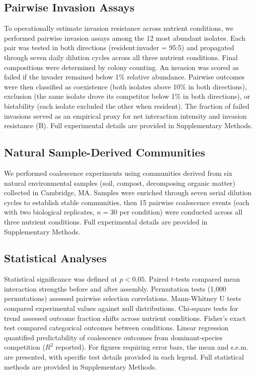 \subsection*{Pairwise Invasion Assays}
\label{sec:methods:invasion}

To operationally estimate invasion resistance across nutrient conditions, we performed pairwise invasion assays among the 12 most abundant isolates. Each pair was tested in both directions (resident:invader = 95:5) and propagated through seven daily dilution cycles across all three nutrient conditions. Final compositions were determined by colony counting. An invasion was scored as failed if the invader remained below 1\% relative abundance. Pairwise outcomes were then classified as coexistence (both isolates above 10\% in both directions), exclusion (the same isolate drove its competitor below 1\% in both directions), or bistability (each isolate excluded the other when resident). The fraction of failed invasions served as an empirical proxy for net interaction intensity and invasion resistance (B). Full experimental details are provided in Supplementary Methods.



\subsection*{Natural Sample-Derived Communities}
\label{sec:methods:natural}

We performed coalescence experiments using communities derived from six natural environmental samples (soil, compost, decomposing organic matter) collected in Cambridge, MA.  Samples were enriched through seven serial dilution cycles to establish stable communities, then 15 pairwise coalescence events (each with two biological replicates, $n = 30$ per condition) were conducted across all three nutrient conditions. Full experimental details are provided in Supplementary Methods.


\subsection*{Statistical Analyses}
\label{sec:methods:statistics}

Statistical significance was defined at $p < 0.05$. Paired $t$-tests compared mean interaction strengths before and after assembly. Permutation tests (1,000 permutations) assessed pairwise selection correlations. Mann-Whitney U tests compared experimental values against null distributions. Chi-square tests for trend assessed outcome fraction shifts across nutrient conditions. Fisher's exact test compared categorical outcomes between conditions. Linear regression quantified predictability of coalescence outcomes from dominant-species competition ($R^2$ reported). For figures requiring error bars, the mean and s.e.m. are presented, with specific test details provided in each legend. Full statistical methods are provided in Supplementary Methods.


